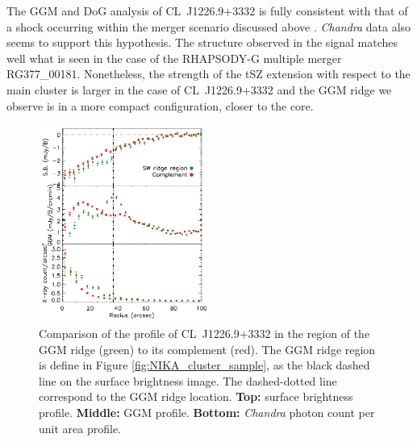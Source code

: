 \documentclass[traditabstract]{aa}
\begin{document}
The GGM and DoG analysis of \mbox{CL~J1226.9+3332} is fully consistent with that of a shock occurring within the merger scenario discussed above \citep[see also][for more details]{Adam2015}. \textit{Chandra} data also seems to support this hypothesis. The structure observed in the signal matches well what is seen in the case of the RHAPSODY-G multiple merger RG377\_00181. Nonetheless, the strength of the tSZ extension with respect to the main cluster is larger in the case of \mbox{CL~J1226.9+3332} and the GGM ridge we observe is in a more compact configuration, closer to the core.

\begin{figure}[h]
\center
\includegraphics[trim=0cm 0cm 0cm 0cm, clip=true, width=0.5\textwidth]{Figure/profile_CLJ1227.pdf} 
\caption{\footnotesize{Comparison of the profile of \mbox{CL~J1226.9+3332} in the region of the GGM ridge (green) to its complement (red). The GGM ridge region is define in Figure \ref{fig:NIKA_cluster_sample}, as the black dashed line on the surface brightness image. The dashed-dotted line correspond to the GGM ridge location. {\bf Top:} surface brightness profile. {\bf Middle:} GGM profile. {\bf Bottom:} \textit{Chandra} photon count per unit area profile.}}
\label{fig:profile_CLJ1227}
\end{figure}

\end{document}
